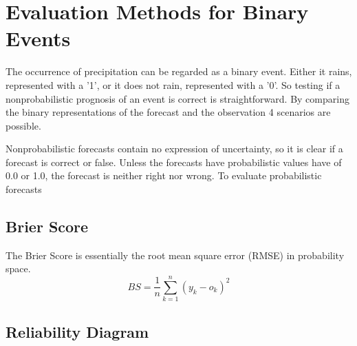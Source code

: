 \documentclass[11pt,twoside,a4paper,fleqn,x11names]{report}
\numberwithin{equation}{chapter}
\numberwithin{figure}{chapter}
\numberwithin{table}{chapter}
\begin{document}
\section{Evaluation Methods for Binary Events}
The occurrence of precipitation can be regarded as a binary event. Either it rains, represented with a '1', or it does not rain, represented with a '0'. So testing if a nonprobabilistic prognosis of an event is correct is straightforward. By comparing the binary representations of the forecast and the observation 4 scenarios are possible.



Nonprobabilistic forecasts contain no expression of uncertainty, so it is clear if a forecast is correct or false. Unless the forecasts have probabilistic values have of 0.0 or 1.0, the forecast is neither right nor wrong.
To evaluate probabilistic forecasts 
\label{subsec:eval}
\citep{Wilks}
\subsection{Brier Score}
The Brier Score is essentially the root mean square error (RMSE) in probability space.
\begin{equation}
	BS = \frac{1}{n}\sum_{k=1}^{n}(y_{k}-o_{k})^{2}
	\label{eq:brier}
\end{equation}
\subsection{Reliability Diagram}
\end{document}
